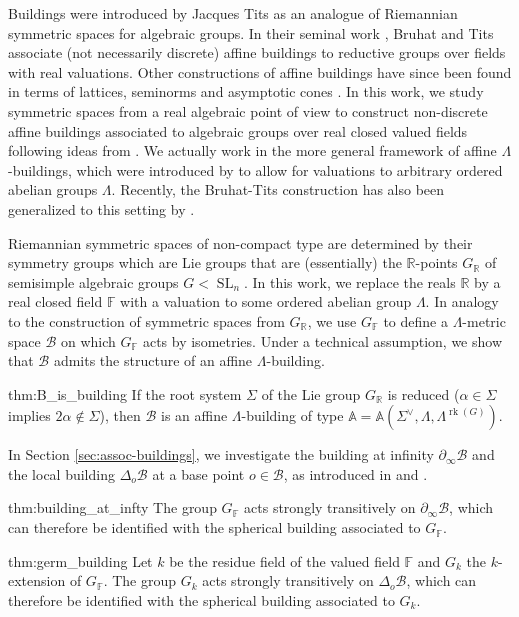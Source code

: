 \documentclass[12pt]{amsart}
\newcommand{\F}{\mathbb{F} }
\newcommand{\R}{\mathbb{R} }
\newcommand{\A}{\mathbb{A}}
\newcommand{\B}{\mathcal{B}}
\numberwithin{equation}{section}
\theoremstyle{remark} %
\begin{document}
Buildings were introduced by Jacques Tits as an analogue of Riemannian symmetric spaces for algebraic groups. In their seminal work \cite{BrTi,BrTi84}, Bruhat and Tits associate (not necessarily discrete) affine buildings to reductive groups over fields with real valuations. Other constructions of affine buildings have since been found in terms of lattices, seminorms \cite{BrTi84_norms, BrTi87, Par} and asymptotic cones \cite{KlLe}. In this work, we study symmetric spaces from a real algebraic point of view to construct non-discrete affine buildings associated to algebraic groups over real closed valued fields following ideas from \cite{Bru2,KrTe}. We actually work in the more general framework of affine $\Lambda$-buildings, which were introduced by \cite{Ben1} to allow for valuations to arbitrary ordered abelian groups $\Lambda$. Recently, the Bruhat-Tits construction has also been generalized to this setting by \cite{HIL23}. %

Riemannian symmetric spaces of non-compact type are determined by their symmetry groups which are Lie groups that are (essentially) the $\R$-points $G_{\R}$ of semisimple algebraic groups $G < \operatorname{SL}_n$. In this work, we replace the reals $\R$ by a real closed field $\F$ with a valuation to some ordered abelian group $\Lambda$. In analogy to the construction of symmetric spaces from $G_{\R}$, we use $G_\F$ to define a $\Lambda$-metric space $\B$ on which $G_\F$ acts by isometries. Under a technical assumption, we show that $\B$ admits the structure of an affine $\Lambda$-building.

\begin{reptheorem}{thm:B_is_building}
	If the root system $\Sigma$ of the Lie group $G_\R$ is reduced ($\alpha \in \Sigma$ implies $2\alpha \notin \Sigma$), then $\B$ is an affine $\Lambda$-building of type $\A = \A(\Sigma^\vee, \Lambda, \Lambda^{\operatorname{rk}(G)})$.
\end{reptheorem} 

In Section \ref{sec:assoc-buildings}, we investigate the building at infinity $\partial_\infty \B$ and the local building $\Delta_o\B$ at a base point $o\in \B$, as introduced in \cite{Ben1} and \cite{Sch09}.

\begin{reptheorem}{thm:building_at_infty}
	The group $G_\F$ acts strongly transitively on $\partial_\infty\B$, which can therefore be identified with the spherical building associated to $G_\F$.
\end{reptheorem}
\begin{reptheorem}{thm:germ_building}
	Let $k$ be the residue field of the valued field $\F$ and $G_k$ the $k$-extension of $G_\F$. The group $G_k$ acts strongly transitively on $\Delta_o \B$, which can therefore be identified with the spherical building associated to $G_k$.
\end{reptheorem}
\end{document}
